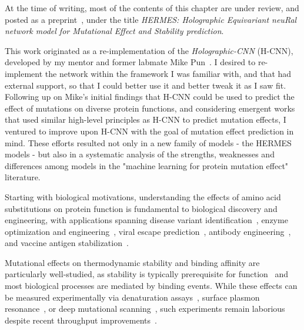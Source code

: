 
At the time of writing, most of the contents of this chapter are under review, and posted as a
preprint~\citet{visani_hermes_2026}, under the title \textit{HERMES: Holographic Equivariant neuRal
network model for Mutational Effect and Stability prediction}.

This work originated as a re-implementation of the \textit{Holographic-CNN} (H-CNN), developed by my mentor
and former labmate Mike Pun~\citep{pun_learning_2024}. I desired to re-implement the network within
the framework I was familiar with, and that had external support, so that I could better use it and better
tweak it as I saw fit. Following up on Mike's initial findings that H-CNN could be used to predict
the effect of mutations on diverse protein functions, and considering emergent works that used similar
high-level principles as H-CNN to predict mutation effects, I ventured to improve upon H-CNN with the goal
of mutation effect prediction in mind. These efforts resulted not only in a new family of models - the
HERMES models - but also in a systematic analysis of the strengths, weaknesses and differences among
models in the "machine learning for protein mutation effect" literature.

Starting with biological motivations, understanding the effects of amino acid substitutions on protein
function is fundamental to biological discovery and engineering, with applications spanning disease
variant identification~\citep{gerasimavicius_identification_2020,blaabjerg_rapid_2023}, enzyme optimization
and engineering~\citep{ishida_effects_2010,wang_d3distalmutation_2021}, viral escape
prediction~\citep{thadani_learning_2023,Luksza2014-pg,Neher2014-pf}, antibody
engineering~\citep{hie_efficient_2024}, and vaccine antigen
stabilization~\citep{mclellan_structure-based_2013, gonzalez_general_2024, bakkers_efficacious_2024,
milder_universal_2022, phan_conserved_2022}.

Mutational effects on thermodynamic stability and binding affinity are particularly well-studied, as
stability is typically prerequisite for function~\citep{rocklin_global_2017} and most biological
processes are mediated by binding events. While these effects can be measured experimentally via
denaturation assays~\citep{lindorff-larsen_linking_2021}, surface plasmon
resonance~\citep{karlsson_spr_2004}, or deep mutational
scanning~\citep{fowler_deep_2014,Kinney2019-wc,starr_deep_2020}, such experiments remain laborious
despite recent throughput improvements~\citep{tsuboyama_mega-scale_2023}.

